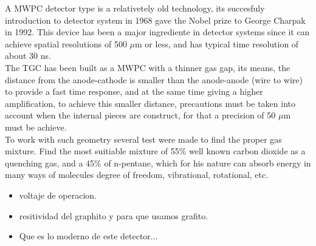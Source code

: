 A MWPC detector type  is a relativetely old technology, its succesfuly introduction to detector system in 1968 gave the Nobel prize to George Charpak in 1992.
This device has been a major ingrediente in detector systems since it can achieve spatial resolutions of 500 $\mu$m or less, and has typical time resolution of
about 30 ns.\\ The TGC has been built as a MWPC with a thinner gas gap, its means, the distance from the anode-cathode is smaller than the anode-anode (wire to
wire) to provide a fast time response, and at the same time giving a higher amplification, to achieve this smaller distance, precautions must be taken into
account when the internal pieces are construct, for that a precision of 50 $\mu$m must be achieve.\\ To work with such geometry several test were made to find
the proper gas mixture\cite{gaschoice}. Find the most suitiable mixture of  55\% well known carbon dioxide as a quenching gas, and a 45\% of n-pentane, which
for his nature can absorb energy in many ways of molecules  degree of freedom, vibrational, rotational, etc.\par 


\begin{itemize}
\item voltaje de operacion.
\item resitividad del graphito y para que usamos grafito.
\item Que es lo moderno de este detector...
\end{itemize}


